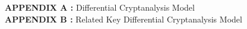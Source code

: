 \singlespacing
\textbf{APPENDIX A :} Differential Cryptanalysis Model\\
\textbf{APPENDIX B :} Related Key Differential Cryptanalysis Model \\
\newpage